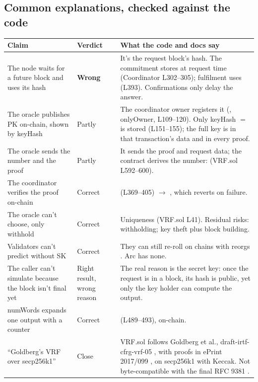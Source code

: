 \documentclass[11pt,a4paper]{article}
\begin{document}
\subsection{Common explanations, checked against the code}
{\small
\begin{tabularx}{\textwidth}{P{3.6cm}P{1.9cm}L}
\toprule
Claim & Verdict & What the code and docs say\\
\midrule
The node waits for a future block and uses its hash & \textbf{Wrong} & It's the request block's hash. The commitment stores  at request time (Coordinator L302--305); fulfilment uses  (L393). Confirmations only delay the answer.\\
The oracle publishes PK on-chain, shown by keyHash & Partly & The coordinator owner registers it (, onlyOwner, L109--120). Only keyHash $=$  is stored (L151--155); the full key is in that transaction's data and in every proof.\\
The oracle sends the number and the proof & Partly & It sends the proof and request data; the contract derives the number:  (VRF.sol L592--600).\\
The coordinator verifies the proof on-chain & Correct &  (L369--405) $\to$ , which reverts on failure.\\
The oracle can't choose, only withhold & Correct & Uniqueness (VRF.sol L41). Residual risks: withholding; key theft plus block building.\\
Validators can't predict without SK & Correct & They can still re-roll on chains with reorgs \cite{clsecurity}. Arc has none.\\
The caller can't simulate because the block isn't final yet & Right result, wrong reason & The real reason is the secret key: once the request is in a block, its hash is public, yet only the key holder can compute the output.\\
numWords expands one output with a counter & Correct &  (L489--493), on-chain.\\
``Goldberg's VRF over secp256k1'' & Close & VRF.sol follows Goldberg et al., draft-irtf-cfrg-vrf-05 \cite{vrfdraft}, with proofs in ePrint 2017/099 \cite{eprint}, on secp256k1 with Keccak. Not byte-compatible with the final RFC 9381 \cite{rfc9381}.\\
\bottomrule
\end{tabularx}}
\end{document}
